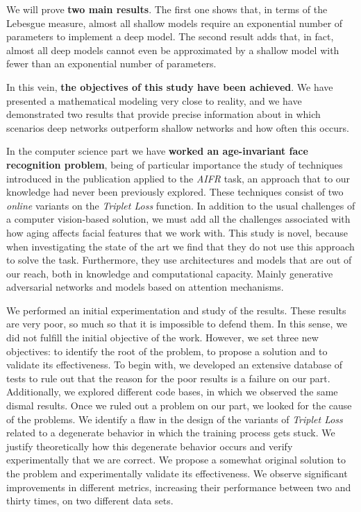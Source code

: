 We will prove \textbf{two main results}. The first one shows that, in terms of the Lebesgue measure, almost all shallow models require an exponential number of parameters to implement a deep model. The second result adds that, in fact, almost all deep models cannot even be approximated by a shallow model with fewer than an exponential number of parameters.

In this vein, \textbf{the objectives of this study have been achieved}. We have presented a mathematical modeling very close to reality, and we have demonstrated two results that provide precise information about in which scenarios deep networks outperform shallow networks and how often this occurs.

In the computer science part we have \textbf{worked an age-invariant face recognition problem}, being of particular importance the study of techniques introduced in the publication \cite{informatica:principal} applied to the \textit{AIFR} task, an approach that to our knowledge had never been previously explored. These techniques consist of two \textit{online} variants on the \textit{Triplet Loss} function. In addition to the usual challenges of a computer vision-based solution, we must add all the challenges associated with how aging affects facial features that we work with. This study is novel, because when investigating the state of the art we find that they do not use this approach to solve the task. Furthermore, they use architectures and models that are out of our reach, both in knowledge and computational capacity. Mainly generative adversarial networks and models based on attention mechanisms.

We performed an initial experimentation and study of the results. These results are very poor, so much so that it is impossible to defend them. In this sense, we did not fulfill the initial objective of the work. However, we set three new objectives: to identify the root of the problem, to propose a solution and to validate its effectiveness. To begin with, we developed an extensive database of tests to rule out that the reason for the poor results is a failure on our part. Additionally, we explored different code bases, in which we observed the same dismal results. Once we ruled out a problem on our part, we looked for the cause of the problems. We identify a flaw in the design of the variants of \textit{Triplet Loss} related to a degenerate behavior in which the training process gets stuck. We justify theoretically how this degenerate behavior occurs and verify experimentally that we are correct. We propose a somewhat original solution to the problem and experimentally validate its effectiveness. We observe significant improvements in different metrics, increasing their performance between two and thirty times, on two different data sets.

